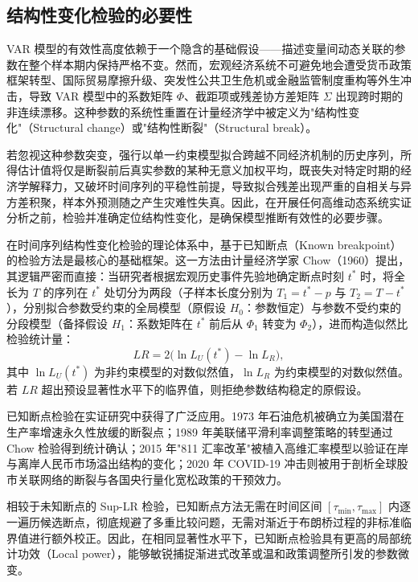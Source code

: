\subsection{结构性变化检验的必要性}

VAR 模型的有效性高度依赖于一个隐含的基础假设——描述变量间动态关联的参数在整个样本期内保持严格不变。然而，宏观经济系统不可避免地会遭受货币政策框架转型、国际贸易摩擦升级、突发性公共卫生危机或金融监管制度重构等外生冲击，导致 VAR 模型中的系数矩阵 $\Phi$、截距项或残差协方差矩阵 $\Sigma$ 出现跨时期的非连续漂移。这种参数的系统性重置在计量经济学中被定义为"结构性变化"（Structural change）或"结构性断裂"（Structural break）。

若忽视这种参数突变，强行以单一约束模型拟合跨越不同经济机制的历史序列，所得估计值将仅是断裂前后真实参数的某种无意义加权平均，既丧失对特定时期的经济学解释力，又破坏时间序列的平稳性前提，导致拟合残差出现严重的自相关与异方差积聚，样本外预测随之产生灾难性失真。因此，在开展任何高维动态系统实证分析之前，检验并准确定位结构性变化，是确保模型推断有效性的必要步骤。

在时间序列结构性变化检验的理论体系中，基于已知断点（Known breakpoint）的检验方法是最核心的基础框架。这一方法由计量经济学家 Chow（1960）提出，其逻辑严密而直接：当研究者根据宏观历史事件先验地确定断点时刻 $t^*$ 时，将全长为 $T$ 的序列在 $t^*$ 处切分为两段（子样本长度分别为 $T_1 = t^* - p$ 与 $T_2 = T - t^*$），分别拟合参数受约束的全局模型（原假设 $H_0$：参数恒定）与参数不受约束的分段模型（备择假设 $H_1$：系数矩阵在 $t^*$ 前后从 $\Phi_1$ 转变为 $\Phi_2$），进而构造似然比检验统计量：
\begin{equation}
LR = 2\bigl(\ln L_U(t^*) - \ln L_R\bigr),
\end{equation}
其中 $\ln L_U(t^*)$ 为非约束模型的对数似然值，$\ln L_R$ 为约束模型的对数似然值。若 $LR$ 超出预设显著性水平下的临界值，则拒绝参数结构稳定的原假设。

已知断点检验在实证研究中获得了广泛应用。1973 年石油危机被确立为美国潜在生产率增速永久性放缓的断裂点；1989 年美联储平滑利率调整策略的转型通过 Chow 检验得到统计确认；2015 年"811 汇率改革"被植入高维汇率模型以验证在岸与离岸人民币市场溢出结构的变化；2020 年 COVID-19 冲击则被用于剖析全球股市关联网络的断裂与各国央行量化宽松政策的干预效力。

相较于未知断点的 Sup-LR 检验，已知断点方法无需在时间区间 $[\tau_{\min}, \tau_{\max}]$ 内逐一遍历候选断点，彻底规避了多重比较问题，无需对渐近于布朗桥过程的非标准临界值进行额外校正。因此，在相同显著性水平下，已知断点检验具有更高的局部统计功效（Local power），能够敏锐捕捉渐进式改革或温和政策调整所引发的参数微变。

